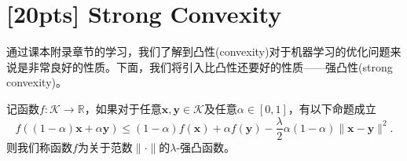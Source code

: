 \documentclass[a4paper,UTF8]{article}
\numberwithin{equation}{section}
\begin{document}
\newpage

\section{[20pts] Strong Convexity}
通过课本附录章节的学习，我们了解到凸性(convexity)对于机器学习的优化问题来说是非常良好的性质。下面，我们将引入比凸性还要好的性质——强凸性(strong convexity)。
\begin{def-box}[强凸性]
记函数$f: \mathcal{K} \rightarrow \mathbb{R}$，如果对于任意$\mathbf{x}, \mathbf{y} \in \mathcal{K}$及任意$\alpha\in[0,1]$，有以下命题成立
\begin{equation}
  \label{eq-sc-1}
  f((1-\alpha)\mathbf{x} + \alpha\mathbf{y})\leq (1-\alpha)f(\mathbf{x}) + \alpha f(\mathbf{y}) - \frac{\lambda}{2}\alpha(1-\alpha)\lVert \mathbf{x} - \mathbf{y}\rVert^2.
\end{equation}
则我们称函数$f$为关于范数$\lVert \cdot \rVert$的$\lambda$-强凸函数。
\end{def-box}
\end{document}
